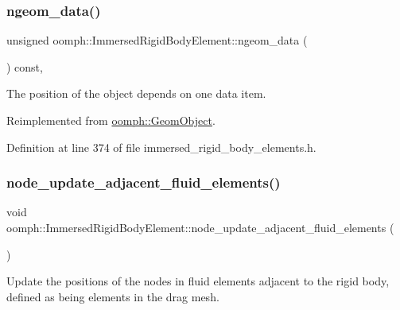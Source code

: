 \subsubsection{\texorpdfstring{ngeom\+\_\+data()}{ngeom\_data()}}
{\footnotesize\ttfamily unsigned oomph\+::\+Immersed\+Rigid\+Body\+Element\+::ngeom\+\_\+data (\begin{DoxyParamCaption}{ }\end{DoxyParamCaption}) const\hspace{0.3cm}{\ttfamily [inline]}, {\ttfamily [virtual]}}



The position of the object depends on one data item. 



Reimplemented from \hyperlink{classoomph_1_1GeomObject_a19d325347e19964e127fe124df56f251}{oomph\+::\+Geom\+Object}.



Definition at line 374 of file immersed\+\_\+rigid\+\_\+body\+\_\+elements.\+h.

\mbox{\label{classoomph_1_1ImmersedRigidBodyElement_af97075da52b4f7b4f01b849a30618ba7}} 
\subsubsection{\texorpdfstring{node\+\_\+update\+\_\+adjacent\+\_\+fluid\+\_\+elements()}{node\_update\_adjacent\_fluid\_elements()}}
{\footnotesize\ttfamily void oomph\+::\+Immersed\+Rigid\+Body\+Element\+::node\+\_\+update\+\_\+adjacent\+\_\+fluid\+\_\+elements (\begin{DoxyParamCaption}{ }\end{DoxyParamCaption})\hspace{0.3cm}{\ttfamily [inline]}}



Update the positions of the nodes in fluid elements adjacent to the rigid body, defined as being elements in the drag mesh. 



